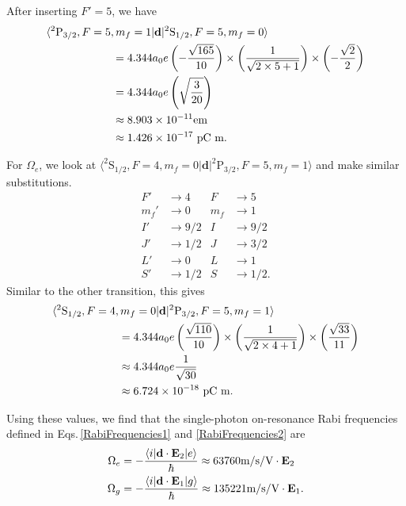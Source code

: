 After inserting $F'=5$, we have 
\begin{align}
\hspace{6em}&\hspace{-6em}\langle ^2\mathrm{P}_{3/2}, F=5, m_f=1|\mathbf{d}|^2\mathrm{S}_{1/2},F=5,m_f=0\rangle\\
&=4.344a_0e\left(-\frac{\sqrt{165}}{10}\right)\times\left(\frac{1}{\sqrt{2\times5+1}}\right)\times\left(-\frac{\sqrt{2}}{2}\right) \\
&=4.344a_0e\left(\sqrt{\frac{3}{20}}\right)\\
&\approx 8.903\times10^{-11} \mathrm{e} \mathrm{m}\\
&\approx 1.426\times10^{-17} \textnormal{ pC} \textnormal{ m}.
\end{align}

For $\Omega_e$, we look at $\langle^2\mathrm{S}_{1/2},F=4,m_f=0|\mathbf{d}|^2\mathrm{P}_{3/2}, F=5, m_f=1\rangle$ and make similar substitutions. 
\begin{align}        
F'&\rightarrow4&      F&\rightarrow5\\
m_f'&\rightarrow0&    m_f&\rightarrow1\\
I'&\rightarrow9/2&    I&\rightarrow9/2\\
J'&\rightarrow1/2&    J&\rightarrow3/2\\
L'&\rightarrow0&      L&\rightarrow1\\
S'&\rightarrow1/2&    S&\rightarrow1/2.
\end{align}
Similar to the other transition, this gives 
\begin{align} 
\hspace{6em}&\hspace{-6em}\langle^2\mathrm{S}_{1/2},F=4,m_f=0|\mathbf{d}|^2\mathrm{P}_{3/2}, F=5, m_f=1\rangle\\
&=4.344a_0e\left(\frac{\sqrt{110}}{10}\right)\times\left(\frac{1}{\sqrt{2\times4+1}}\right)\times\left(\frac{\sqrt{33}}{11}\right) \\
&\approx4.344a_0e\frac{1}{\sqrt{30}}\\
&\approx6.724\times10^{-18} \textnormal{ pC m}.
\end{align}

Using these values, we find that the single-photon on-resonance Rabi frequencies defined in Eqs.\,\eqref{RabiFrequencies1} and \eqref{RabiFrequencies2} are 
\begin{align}
\label{RabiFrequenciesnumbers}
\Omega_e&=-\frac{\langle i | \mathbf{d}\cdot \mathbf{E}_2 | e\rangle}{\hbar}\approx63760 \textnormal{m/s/V}\cdot \mathbf{E}_2\\
\Omega_g&=-\frac{\langle i | \mathbf{d}\cdot \mathbf{E}_1 | g\rangle}{\hbar}\approx135221 \textnormal{m/s/V}\cdot \mathbf{E}_1.
\end{align}

